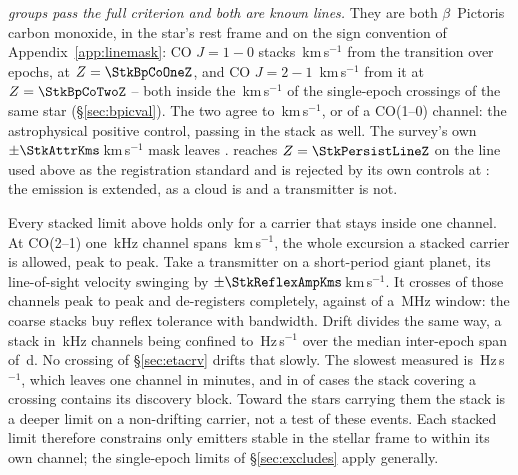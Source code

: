 \emph{\StkNSurvive{} groups pass the full criterion and both are known
lines.} They are both $\beta$~Pictoris carbon monoxide, in the star's rest
frame and on the sign convention of Appendix~\ref{app:linemask}: CO
$J=1\!-\!0$ stacks \StkBpCoOneOff\,km\,s$^{-1}$ from the transition over
\StkBpCoOneN{} epochs, at $Z=\StkBpCoOneZ$, and CO $J=2\!-\!1$
\StkBpCoTwoOff\,km\,s$^{-1}$ from it at $Z=\StkBpCoTwoZ$ -- both inside the
\BpicDvCoHi\,km\,s$^{-1}$ of the single-epoch crossings of the same star
(\S\ref{sec:bpicval}). The two agree to \StkBpCrossKms\,km\,s$^{-1}$, or
\StkBpCrossChan{} of a CO(1--0) channel: the astrophysical positive control,
passing in the stack as well. The
survey's own $\pm\StkAttrKms$\,km\,s$^{-1}$ mask leaves
\StkUnattrClause. \StkPersistLineStar{} reaches
$Z=\StkPersistLineZ$ on the line used above as the registration standard and is
rejected by its own controls at \StkPersistLineCtrl: the emission is extended,
as a cloud is and a transmitter is not.

Every stacked limit above holds only for a carrier that stays inside one
channel. At CO(2--1) one \StkRefChanKHz\,kHz channel spans
\StkTolFineKms\,km\,s$^{-1}$, the whole excursion a stacked carrier is
allowed, peak to peak. Take a transmitter on a short-period giant planet, its line-of-sight
velocity swinging by $\pm\StkReflexAmpKms$\,km\,s$^{-1}$. It crosses
\SzReflexPPChanFine{} of those channels peak to peak and de-registers
completely, against \SzReflexPPChanCoarse{} of a \ChanBModeMHz\,MHz window:
the coarse stacks buy reflex tolerance with bandwidth. Drift divides the same way, a
stack in \StkRefChanKHz\,kHz channels being confined to
\StkDriftTolHzS\,Hz\,s$^{-1}$ over the median inter-epoch span of
\StkSpanMedD\,d. No crossing of \S\ref{sec:etacrv} drifts that slowly. The slowest measured
is \SttDriftMinHzS\,Hz\,s$^{-1}$, which leaves one channel in
\SttDriftMinMin{} minutes, and in \SttNIncDisc{} of \NUnattributed{} cases
the stack covering a crossing contains its discovery block. Toward the
\SttNHostStar{} stars carrying them the stack is a deeper limit on a
non-drifting carrier, not a test of these events. Each
stacked limit therefore constrains only emitters stable in the stellar frame to
within its own channel; the single-epoch limits of \S\ref{sec:excludes} apply
generally.
